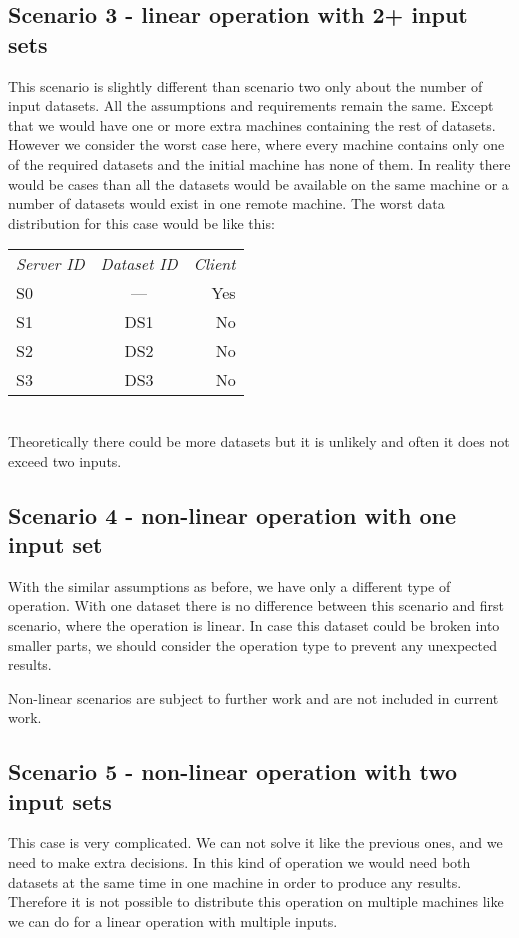 \subsection{Scenario 3 - linear operation with 2+ input sets}
\label{sc:sc3}
This scenario is slightly different than scenario two only about the number of input datasets. All the assumptions and 
requirements remain the same. Except that we would have one or more extra machines containing the rest of datasets.
However we consider the worst case here, where every machine contains only one of the required datasets and the initial 
machine has none of them.
In reality there would be cases than all the datasets would be available on the same machine or a number of datasets
would exist in one remote machine. The worst data distribution for this case would be like this:
\\
\begin{tabular}{ l c r }
\em{Server ID} & \em{ Dataset ID} & \em{ Client} \\
S0 & --- & Yes \\
S1 & DS1 & No \\
S2 & DS2 & No \\
S3 & DS3 & No \\
\end{tabular}\\

Theoretically there could be more datasets but it is unlikely and often it does not exceed two inputs.


\subsection{Scenario 4 - non-linear operation with one input set}
With the similar assumptions as before, we have only a different type of operation. With one dataset there is no 
difference between this scenario and first scenario, where the operation is linear. 
In case this dataset could
be broken into smaller parts, we should consider the operation type to prevent any unexpected results.

Non-linear scenarios are subject to further work and are not included in current work.

\subsection{Scenario 5 - non-linear operation with two input sets}
This case is very complicated. We can not solve it like the previous ones, and we need to make extra decisions.
In this kind of operation we would need both datasets at the same time in one machine in order to produce any
results. Therefore it is not possible to distribute this operation on multiple machines like we can do for 
a linear operation with multiple inputs. 

